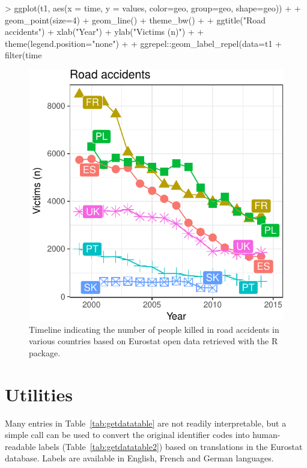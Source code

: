 \begin{example}
> ggplot(t1, aes(x = time, y = values, color=geo, group=geo, shape=geo)) +
+   geom_point(size=4) + geom_line() + theme_bw() +
+   ggtitle("Road accidents") + xlab("Year") + ylab("Victims (n)") +
+   theme(legend.position="none") +
+   ggrepel::geom_label_repel(data=t1 %
+     filter(time %
\end{example}

\begin{figure}[h]
\begin{center}
\includegraphics{2015-manu-roadacc-1}
\end{center}
\caption{Timeline indicating the number of people killed in road accidents in various countries based on Eurostat open data retrieved with the  R package.}
\label{fig:transport}
\end{figure}




\section{Utilities}

Many entries in Table~\ref{tab:getdatatable} are not readily interpretable, but a simple call  can be used to convert the original identifier codes into human-readable labels (Table~\ref{tab:getdatatable2}) based on translations in the Eurostat database. Labels are available in English, French and German languages.

